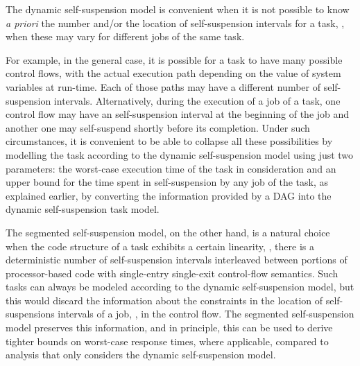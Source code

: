 The dynamic self-suspension model is convenient when it is not possible to know \textit{a priori} the number and/or the location of self-suspension intervals for a task, \eg, when these may vary for different jobs of the same task.

For example, in the general case, it is possible for a task to have many possible control flows, with the actual execution path depending on the value
of system variables at run-time. Each of those paths may have a different
number of self-suspension intervals. Alternatively, during the execution of a job of a task, one control flow may have an self-suspension interval at the beginning of the job and
another one may self-suspend shortly before its completion. Under such circumstances, it is convenient to be able to collapse all these possibilities
by modelling the task according to the dynamic self-suspension model using
just two parameters: the worst-case execution time of the task in consideration and an upper bound for the time spent in self-suspension by any job of the task, as explained earlier, by converting the information provided by a DAG into the dynamic self-suspension task model. 
  
The segmented self-suspension model, on the other hand, is a natural choice when the code structure of a task exhibits a certain linearity,
\ie, there is a deterministic number of self-suspension intervals interleaved between portions of processor-based code with single-entry
single-exit control-flow semantics. Such tasks can always be modeled according to the dynamic self-suspension
model, but this would discard the information about the constraints in the location of self-suspensions intervals of a job, \eg, in the control flow. The segmented self-suspension model preserves this information, and in principle, this can be used 
to derive tighter bounds on worst-case response times, where applicable, compared to analysis that only considers the dynamic self-suspension model. 


